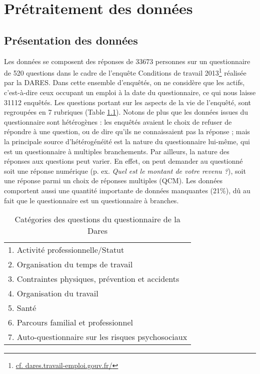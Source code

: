 \documentclass[11pt,fleqn,openany,frenchb]{book} %
\begin{document}
\chapter{Prétraitement des données}
\section{Présentation des données}

Les données se composent des réponses de 33673 personnes sur un questionnaire de 520 questions dans le cadre de l'enquête Conditions de travail 2013\footnote{\href{http://dares.travail-emploi.gouv.fr/dares-etudes-et-statistiques/enquetes-de-a-a-z/article/conditions-de-travail-edition-2013}{cf. dares.travail-emploi.gouv.fr/}} réalisée par la DARES. Dans cette ensemble d'enquêtés, on ne considère que les actifs, c'est-à-dire ceux occupant un emploi à la date du questionnaire, ce qui nous laisse 31112 enquêtés. Les questions portant sur les aspects de la vie de l'enquêté, sont regroupées en 7 rubriques (Table \ref{tab:cat_questions}). Notons de plus que les données issues du questionnaire sont hétérogènes : les enquêtés avaient le choix de refuser de répondre à une question, ou de dire qu'ils ne connaissaient pas la réponse ; mais la principale source d'hétérogénéité est la nature du questionnaire lui-même, qui est un questionnaire à multiples branchements. Par ailleurs, la nature des réponses aux questions peut varier. En effet, on peut demander au questionné soit une réponse numérique (p. ex. \textit{Quel est le montant de votre revenu ?}), soit une réponse parmi un choix de réponses multiples (QCM). Les données comportent aussi une quantité importante de données manquantes (21\%), dû au fait que le questionnaire est un questionnaire à branches.\par

\begin{table}[!h]
\centering
\begin{tabular}{|l|}
\hline
1. Activité professionnelle/Statut\\
2. Organisation du temps de travail \\
3. Contraintes physiques, prévention et accidents \\
4. Organisation du travail \\
5. Santé \\
6. Parcours familial et professionnel\\
7. Auto-questionnaire sur les risques psychosociaux\\
\hline
\end{tabular}%
\caption{Catégories des questions du questionnaire de la Dares}
\label{tab:cat_questions}
\end{table}
\end{document}
